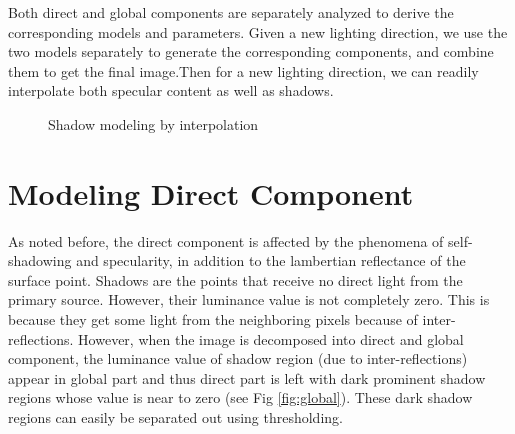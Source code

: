 Both direct and global components are separately analyzed to derive the
corresponding models and parameters. Given a new lighting direction, we use the
two models separately to generate the corresponding components, and combine them
to get the final image.Then for a new lighting direction, we can readily
interpolate both specular content as well as shadows.

\begin{figure}[t]
\centering
{}
\label{fig:shadowmodel}
\caption{Shadow modeling by interpolation}
\end{figure}

\section{Modeling Direct Component}

As noted before, the direct component is affected by the phenomena of
self-shadowing and specularity, in addition to the lambertian reflectance of the
surface point. Shadows are the points that receive no direct light from the
primary source. However, their luminance value is not completely zero. This is
because they get some light from the neighboring pixels because of
inter-reflections. However, when the image is decomposed into direct and global
component, the luminance value of shadow region (due to inter-reflections)
appear in global part and thus direct part is left with dark prominent shadow
regions whose value is near to zero (see Fig \ref{fig:global}). These dark shadow regions
can easily be separated out using thresholding.

